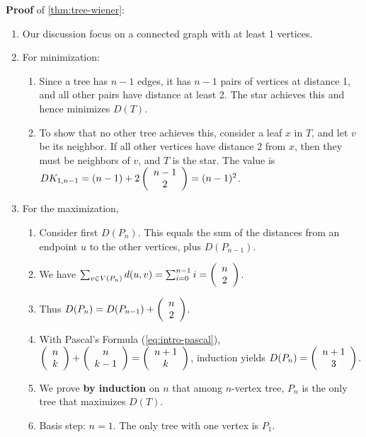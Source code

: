 \documentclass[../src/handouts/main.tex]{subfiles}
\begin{document}
\textbf{Proof} of \cref{thm:tree-wiener}:
\begin{enumerate}
  \item Our discussion focus on a connected graph with at least 1 vertices.
  \item For minimization:
    \begin{enumerate}
      \item Since a tree has $n - 1$ edges, it has $n - 1$ pairs of vertices at distance 1, and all other pairs have distance at least 2.  The star achieves this and hence minimizes $D(T)$.
      \item To show that no other tree achieves this, consider a leaf $x$ in $T$, and let $v$ be its neighbor. If all other vertices have distance 2 from $x$, then they must be neighbors of $v$, and $T$ is the star. The value is $D K _{1, n - 1} = (n - 1) + 2  \left( \begin{array}{c} n - 1 \\ 2 \end{array} \right)  = (n - 1)^2$.
    \end{enumerate}

  \item For the maximization,
    \begin{enumerate}
      \item Consider first $D(P_n)$. This equals the sum of the distances from an endpoint $u$ to the other vertices, plus $D(P_{n - 1})$.

      \item We have $\sum_{v \in V(P_n)} d(u, v) = \sum_{i = 0}^{n - 1} i =  \left( \begin{array}{c} n \\ 2 \end{array} \right) $.

      \item Thus $D(P_n) = D(P_{n - 1}) +  \left( \begin{array}{c} n \\ 2 \end{array} \right) $.

      \item With Pascal's Formula (\cref{eq:intro-pascal}), $ \left( \begin{array}{c} n \\ k \end{array} \right)  +  \left( \begin{array}{c} n \\ k - 1 \end{array} \right)  =  \left( \begin{array}{c} n + 1 \\ k \end{array} \right) $, induction yields $D(P_n) =  \left( \begin{array}{c} n + 1 \\ 3 \end{array} \right) $.

      \item We prove \textbf{by induction} on $n$ that among $n$-vertex tree, $P_n$ is the only tree that maximizes $D(T)$.

      \item Basis step: $n = 1$. The only tree with one vertex is $P_1$.


\end{enumerate}
\end{enumerate}
\end{document}
